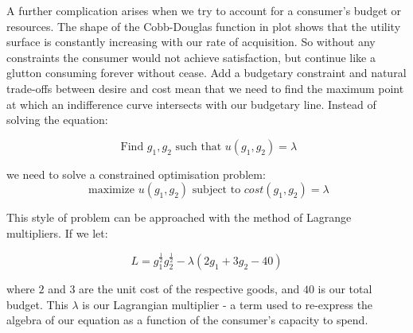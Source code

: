 \documentclass[
]{book}
\theoremstyle{definition}
\theoremstyle{definition}
\theoremstyle{definition}
\theoremstyle{remark}
\begin{document}
A further complication arises when we try to account for a consumer's budget or resources. The shape of the Cobb-Douglas function in plot shows that the utility surface is constantly increasing with our rate of acquisition. So without any constraints the consumer would not achieve satisfaction, but continue like a glutton consuming forever without cease. Add a budgetary constraint and natural trade-offs between desire and cost mean that we need to find the maximum point at which an indifference curve intersects with our budgetary line. Instead of solving the equation:

\[ \text{ Find } g_{1}, g_{2} \text{ such that } u(g_{1}, g_{2}) = \lambda \]

we need to solve a constrained optimisation problem: \[ \text{ maximize } u(g_{1}, g_{2})  \text{ subject to } cost(g_{1}, g_{2}) =  \lambda\]

This style of problem can be approached with the method of Lagrange multipliers. If we let:

\[ L = g_{1}^{\frac{1}{2}}g_{2}^{\frac{1}{2}} - \lambda(2g_{1} + 3g_{2} - 40) \]

where \(2\) and \(3\) are the unit cost of the respective goods, and \(40\) is our total budget. This \(\lambda\) is our Lagrangian multiplier - a term used to re-express the algebra of our equation as a function of the consumer's capacity to spend.
\end{document}
